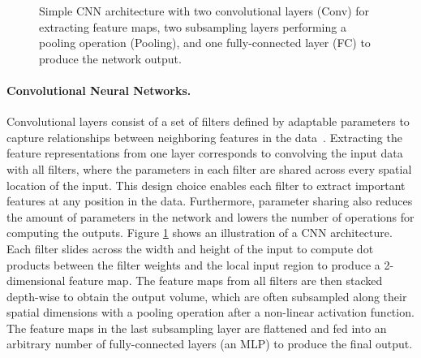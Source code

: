


\begin{figure}[t]
	\centering
	\resizebox{0.95\textwidth}{!}{
		
	}
	\caption{Simple CNN architecture with two convolutional layers (Conv) for extracting feature maps, two subsampling layers performing a pooling operation (Pooling), and one fully-connected layer (FC) to produce the network output.}
	\label{fig:cnn_simple}
\end{figure}

\vspace{-3mm}
\paragraph{Convolutional Neural Networks.} 
Convolutional layers consist of a set of filters defined by adaptable parameters to capture relationships between neighboring features in the data~\cite{lecun1998gradient}. %
Extracting the feature representations from one layer corresponds to convolving the input data with all filters, where the parameters in each filter are shared across every spatial location of the input. 
This design choice enables each filter to extract important features at any position in the data. Furthermore, parameter sharing also reduces the amount of parameters in the network and lowers the number of operations for computing the outputs. Figure \ref{fig:cnn_simple} shows an illustration of a CNN architecture. Each filter slides across the width and height of the input to compute dot products between the filter weights and the local input region to produce a 2-dimensional feature map. The feature maps from all filters are then stacked depth-wise to obtain the output volume, which are often subsampled along their spatial dimensions with a pooling operation after a non-linear activation function. The feature maps in the last subsampling layer are flattened and fed into an arbitrary number of fully-connected layers (an MLP) to produce the final output. 


